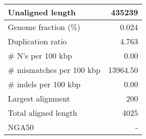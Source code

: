 \documentclass[12pt,a4paper]{article}
\begin{document}
\begin{table}[ht]
\begin{center}
\begin{tabular}{|l*{1}{|r}|}
Unaligned length & 435239 \\ \hline
Genome fraction (\%) & 0.024 \\ \hline
Duplication ratio & 4.763 \\ \hline
\# N's per 100 kbp & 0.00 \\ \hline
\# mismatches per 100 kbp & 13964.50 \\ \hline
\# indels per 100 kbp & 0.00 \\ \hline
Largest alignment & 200 \\ \hline
Total aligned length & 4025 \\ \hline
NGA50 & - \\ \hline
\end{tabular}
\end{center}
\end{table}
\end{document}
